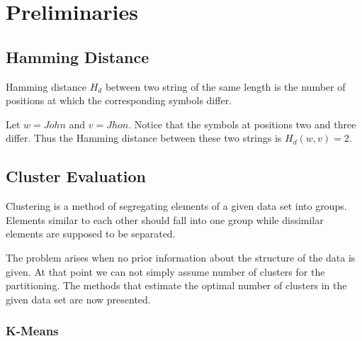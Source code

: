 \documentclass{article}
\begin{document}
\newpage




\section{Preliminaries}\label{sec:prelim}



\subsection{Hamming Distance} \label{sec:hamming}

Hamming distance $H_d$ between two string of the same length is the number of positions at which the corresponding symbols differ.

Let $w = John$ and $v = Jhon$. Notice that the symbols at positions two and three differ. Thus the Hamming distance between these two strings is $H_d(w,v) = 2$.

\subsection{Cluster Evaluation} \label{sec::cluster}

Clustering is a method of segregating elements of a given data set into groups. Elements similar to each other should fall into one group while dissimilar elements are supposed to be separated.

The problem arises when no prior information about the structure of the data is given. At that point we can not simply assume number of clusters for the partitioning. The methods that estimate the optimal number of clusters in the given data set are now presented.

\subsubsection{K-Means}
\end{document}

